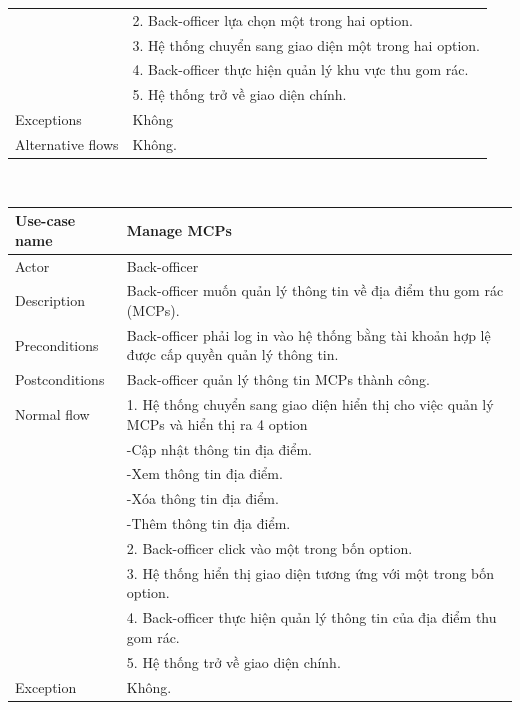 \documentclass[a4paper]{article}
\begin{document}
\begin{enumerate}
\begin{tabular}{|p{3cm} | p{10cm}|}
    &2. Back-officer lựa chọn một trong hai option. \\
    &3. Hệ thống chuyển sang giao diện một trong hai option. \\
    &4. Back-officer thực hiện quản lý khu vực thu gom rác. \\
    &5. Hệ thống trở về giao diện chính. \\
    \hline 
    Exceptions & Không \\
    \hline
    Alternative flows & Không. \\
\hline
\end{tabular}
\vspace{0.5cm}
\\
 \begin{tabular}{| p{3cm} | p{10cm} |}
  \hline
     Use-case name & \textbf{Manage MCPs}
     \\
     \hline
     Actor & Back-officer
     \\ \hline
     Description & Back-officer muốn quản lý thông tin về địa điểm thu gom rác (MCPs). \\
     \hline
     Preconditions & Back-officer phải log in vào hệ thống bằng tài khoản hợp lệ được cấp quyền quản lý thông tin.
     \\ \hline
     Postconditions & Back-officer quản lý thông tin MCPs thành công. \\
     \hline
      Normal flow & 1. Hệ thống chuyển sang giao diện hiển thị cho việc quản lý MCPs và hiển thị ra 4 option \\
        & \hspace{1cm} -Cập nhật thông tin địa điểm. \\
        & \hspace{1cm} -Xem thông tin địa điểm. \\
        & \hspace{1cm} -Xóa thông tin địa điểm. \\
        & \hspace{1cm} -Thêm thông tin địa điểm. \\ 
    & 2. Back-officer click vào một trong bốn option. \\
    & 3. Hệ thống hiển thị giao diện tương ứng với một trong bốn option. \\
    & 4. Back-officer thực hiện quản lý thông tin của địa điểm thu gom rác. \\
    &5. Hệ thống trở về giao diện chính.\\
\hline
     Exception & Không.  
     \\ \hline

\end{tabular}
\end{enumerate}
\end{document}

